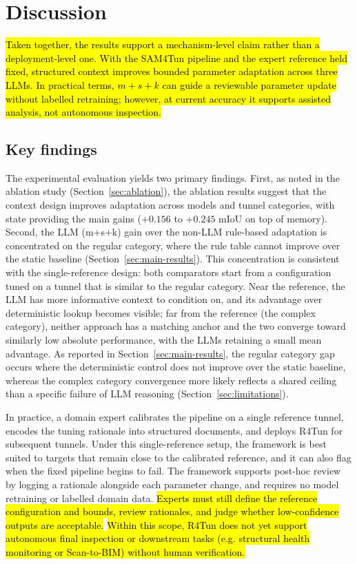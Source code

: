 \documentclass[a4paper,fleqn]{cas-dc}
\begin{document}
{%
\section{Discussion}\label{sec:discussion}

\hl{Taken together, the results support a mechanism-level claim rather than a deployment-level one. With the SAM4Tun pipeline and the expert reference held fixed, structured context improves bounded parameter adaptation across three LLMs. In practical terms, \mbox{$m+s+k$} can guide a reviewable parameter update without labelled retraining; however, at current accuracy it supports assisted analysis, not autonomous inspection.}

\subsection{Key findings}

The experimental evaluation yields two primary findings. First, as noted in the ablation study (Section~\ref{sec:ablation}), the ablation results suggest that the context design improves adaptation across models and tunnel categories, with state providing the main gains ($+0.156$ to $+0.245$ mIoU on top of memory). Second, the LLM (m+s+k) gain over the non-LLM rule-based adaptation is concentrated on the regular category, where the rule table cannot improve over the static baseline (Section~\ref{sec:main-results}). This concentration is consistent with the single-reference design: both comparators start from a configuration tuned on a tunnel that is similar to the regular category. Near the reference, the LLM has more informative context to condition on, and its advantage over deterministic lookup becomes visible; far from the reference (the complex category), neither approach has a matching anchor and the two converge toward similarly low absolute performance, with the LLMs retaining a small mean advantage. As reported in Section~\ref{sec:main-results}, the regular category gap occurs where the deterministic control does not improve over the static baseline, whereas the complex category convergence more likely reflects a shared ceiling than a specific failure of LLM reasoning (Section~\ref{sec:limitations}).


In practice, a domain expert calibrates the pipeline on a single reference tunnel, encodes the tuning rationale into structured documents, and deploys R4Tun for subsequent tunnels. Under this single-reference setup, the framework is best suited to targets that remain close to the calibrated reference, and it can also flag when the fixed pipeline begins to fail. The framework supports post-hoc review by logging a rationale alongside each parameter change, and requires no model retraining or labelled domain data. \hl{Experts must still define the reference configuration and bounds, review rationales, and judge whether low-confidence outputs are acceptable.} \hl{Within this scope, R4Tun does not yet support autonomous final inspection or downstream tasks (e.g. structural health monitoring or Scan-to-BIM) without human verification.}


}
\end{document}
